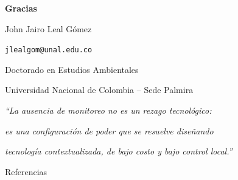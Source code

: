 \documentclass[aspectratio=169, 11pt]{beamer}
\begin{document}
\begin{frame}[plain]

\centering
\vspace{2cm}

{\Huge \textbf{Gracias}}

\vspace{1.5cm}

{\large John Jairo Leal G\'omez}

\vspace{0.3cm}

\texttt{jlealgom@unal.edu.co}

\vspace{0.3cm}

Doctorado en Estudios Ambientales

Universidad Nacional de Colombia -- Sede Palmira

\vspace{1cm}

\footnotesize
\textit{``La ausencia de monitoreo no es un rezago tecnol\'ogico:}

\textit{es una configuraci\'on de poder que se resuelve dise\~nando}

\textit{tecnolog\'ia contextualizada, de bajo costo y bajo control local.''}

\end{frame}

\begin{frame}[allowframebreaks]{Referencias}
\footnotesize
\printbibliography
\end{frame}
\end{document}
